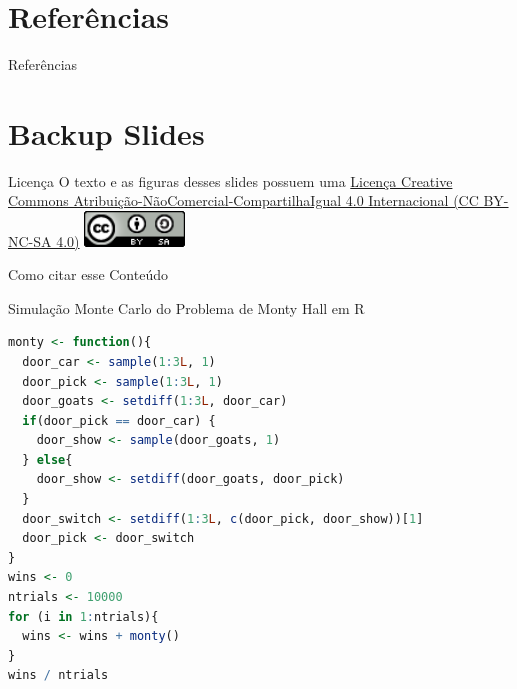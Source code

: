 \documentclass[aspectratio=169]{beamer}                    %
\begin{document}

\begingroup
    \AtBeginSection[]{}
    \section{Referências}
    \begin{frame}[allowframebreaks]{Referências}
        \printbibliography
    \end{frame}
\endgroup

\appendix %
\section*{Backup Slides}
\begin{frame}{Licença}
    \centering
    \vfill
    \Large O texto e as figuras desses slides possuem uma
    \href{https://creativecommons.org/licenses/by-nc-sa/4.0/deed.pt}{Licença
    Creative Commons
    Atribuição-NãoComercial-CompartilhaIgual 4.0 Internacional (CC BY-NC-SA 4.0)}
    \vfill
    \includegraphics[width = 0.2\textwidth]{CC_SA.png}
\end{frame}

\begin{frame}{Como citar esse Conteúdo}
  \centering
  \vfill
  \Large {}
  \vfill
\end{frame}

\begin{frame}[plain, noframenumbering, label=appendixmontyhall, fragile]{Simulação Monte Carlo do Problema de Monty Hall em R}
  \begin{lstlisting}[basicstyle=\footnotesize, language=R]
monty <- function(){
  door_car <- sample(1:3L, 1)
  door_pick <- sample(1:3L, 1)
  door_goats <- setdiff(1:3L, door_car)
  if(door_pick == door_car) {
    door_show <- sample(door_goats, 1)
  } else{
    door_show <- setdiff(door_goats, door_pick)
  }
  door_switch <- setdiff(1:3L, c(door_pick, door_show))[1]
  door_pick <- door_switch
}
wins <- 0
ntrials <- 10000
for (i in 1:ntrials){
  wins <- wins + monty()
}
wins / ntrials
    \end{lstlisting}
\end{frame}
\end{document}
